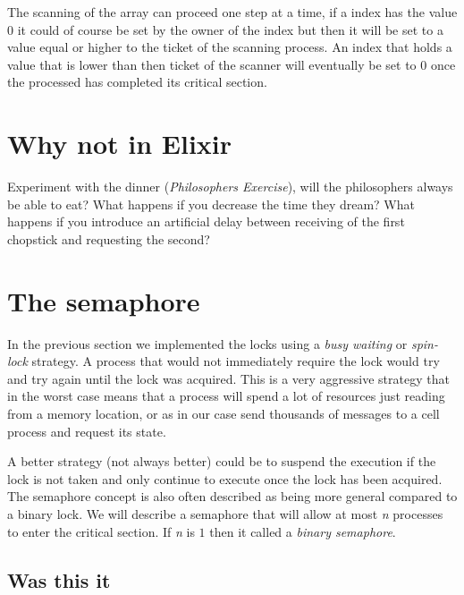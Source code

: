 \documentclass[a4paper,11pt]{article}
\begin{document}
The scanning of the array can proceed one step at a time, if a index
has the value $0$
it could of course be set by the owner of the index but then it will be
set to a value equal or higher to the ticket of the scanning
process. An index that holds a value that is lower than then ticket of
the scanner will eventually be set to $0$
once the processed has completed its critical section. 



\section{Why not in Elixir}

Experiment with the dinner ({\em Philosophers Exercise}), will the philosophers always be able to
eat? What happens if you decrease the time they dream? What happens if
you introduce an artificial delay between receiving of the first
chopstick and requesting the second?



\section{The semaphore}

In the previous section we implemented the locks using a {\em busy
    waiting} or {\em spin-lock} strategy. A process that would not
immediately require the lock would try and try again until the lock
was acquired. This is a very aggressive strategy that in the worst case
means that a process will spend a lot of resources just reading from a
memory location, or as in our case send thousands of messages to a
cell process and request its state.

A better strategy (not always better) could be to suspend the
execution if the lock is not taken and only continue to execute once
the lock has been acquired. The semaphore concept is also often
described as being more general compared to a binary lock. We will
describe a semaphore that will allow at most {\em n} processes to
enter the critical section. If {\em n} is $1$
then it called a {\em binary semaphore}.


\subsection{Was this it}
\end{document}
